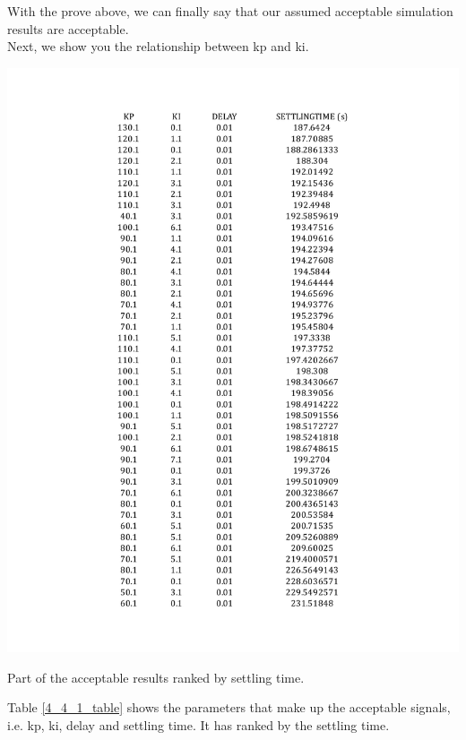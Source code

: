 \documentclass{report}
\begin{document}
With the prove above, we can finally say that our assumed acceptable simulation results are acceptable.\\

Next, we show you the relationship between kp and ki.\\

\begin{table}[htbp]
\centering
\includegraphics[width = \textwidth]{figure/4_4_1_table.pdf}
\caption{Part of the acceptable results ranked by settling time.}
\label{4_4_1_table}
\end{table}

 Table \textcolor{red}{\ref{4_4_1_table}} shows the parameters that make up the acceptable signals, i.e. kp, ki, delay and settling time. It has ranked by the settling time. \\
\end{document}

